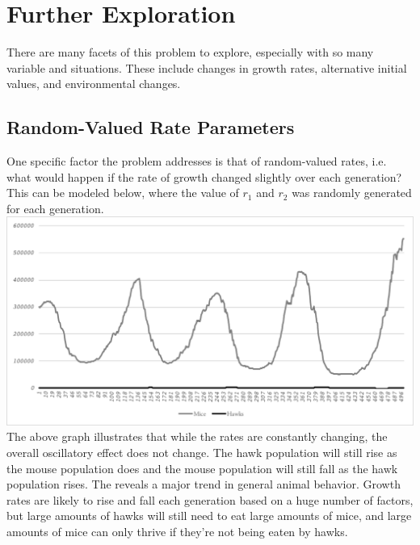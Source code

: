\documentclass[10pt,letterpaper]{article}
\begin{document}
	\section{Further Exploration}
		There are many facets of this problem to explore, especially with so many variable and situations. These include changes in growth rates, alternative initial values, and environmental changes. 
		\subsection{Random-Valued Rate Parameters}
			One specific factor the problem addresses is that of random-valued rates, i.e. what would happen if the rate of growth changed slightly over each generation? This can be modeled below, where the value of $r_{1}$ and $r_{2}$ was randomly generated for each generation.
			\newline
			\includegraphics[width=\textwidth]{graph2.pdf}
			\newline 
			The above graph illustrates that while the rates are constantly changing, the overall oscillatory effect does not change. The hawk population will still rise as the mouse population does and the mouse population will still fall as the hawk population rises. The reveals a major trend in general animal behavior. Growth rates are likely to rise and fall each generation based on a huge number of factors, but large amounts of hawks will still need to eat large amounts of mice, and large amounts of mice can only thrive if they're not being eaten by hawks. 
\end{document}
